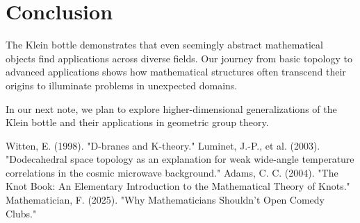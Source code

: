 \documentclass{article}
\begin{document}
\section{Conclusion}

The Klein bottle demonstrates that even seemingly abstract mathematical objects find applications across diverse fields. Our journey from basic topology to advanced applications shows how mathematical structures often transcend their origins to illuminate problems in unexpected domains.

In our next note, we plan to explore higher-dimensional generalizations of the Klein bottle and their applications in geometric group theory.

\begin{thebibliography}{9}
     Witten, E. (1998). "D-branes and K-theory."
     Luminet, J.-P., et al. (2003). "Dodecahedral space topology as an explanation for weak wide-angle temperature correlations in the cosmic microwave background."
     Adams, C. C. (2004). "The Knot Book: An Elementary Introduction to the Mathematical Theory of Knots."
     Mathematician, F. (2025). "Why Mathematicians Shouldn't Open Comedy Clubs."
\end{thebibliography}
\end{document}
